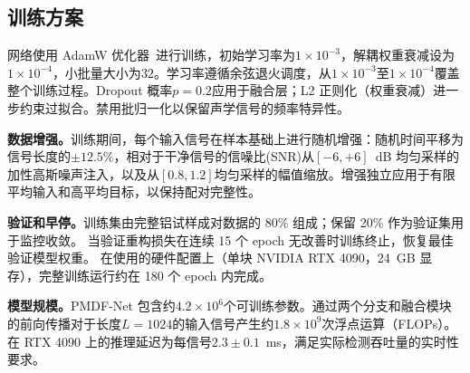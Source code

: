 \subsection{训练方案}
\label{sec:training}

网络使用 AdamW 优化器~\cite{Loshchilov2019}进行训练，初始学习率为$1 \times 10^{-3}$，解耦权重衰减设为$1 \times 10^{-4}$，小批量大小为$32$。学习率遵循余弦退火调度，从$1 \times 10^{-3}$至$1 \times 10^{-4}$覆盖整个训练过程。Dropout 概率$p = 0.2$应用于融合层；L2 正则化（权重衰减）进一步约束过拟合。禁用批归一化以保留声学信号的频率特异性。

\textbf{数据增强。}训练期间，每个输入信号在样本基础上进行随机增强：随机时间平移为信号长度的$\pm 12.5\%$，相对于干净信号的信噪比(SNR)从$[-6, +6]$~dB 均匀采样的加性高斯噪声注入，以及从$[0.8, 1.2]$均匀采样的幅值缩放。增强独立应用于有限平均输入和高平均目标，以保持配对完整性。

\textbf{验证和早停。}训练集由完整铝试样成对数据的 80\% 组成；保留 20\% 作为验证集用于监控收敛。
当验证重构损失在连续 15 个 epoch 无改善时训练终止，恢复最佳验证模型权重。
在使用的硬件配置上（单块 NVIDIA RTX 4090，24~GB 显存），完整训练运行约在 180 个 epoch 内完成。

\textbf{模型规模。}PMDF-Net 包含约$4.2 \times 10^6$个可训练参数。通过两个分支和融合模块的前向传播对于长度$L = 1024$的输入信号产生约$1.8 \times 10^9$次浮点运算（FLOPs）。在 RTX 4090 上的推理延迟为每信号$2.3 \pm 0.1$~ms，满足实际检测吞吐量的实时性要求。